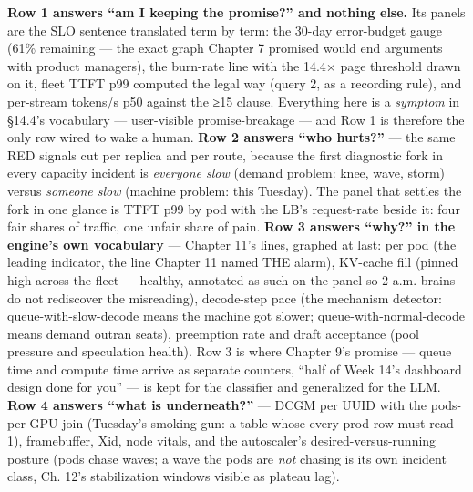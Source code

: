 \textbf{Row 1 answers “am I keeping the promise?” and nothing else.} Its panels are the SLO sentence translated term by term: the 30-day error-budget gauge (61\% remaining — the exact graph Chapter 7 promised would end arguments with product managers), the burn-rate line with the 14.4× page threshold drawn on it, fleet TTFT p99 computed the legal way (query 2, as a recording rule), and per-stream tokens/s p50 against the ≥15 clause. Everything here is a \textit{symptom} in §14.4’s vocabulary — user-visible promise-breakage — and Row 1 is therefore the only row wired to wake a human. \textbf{Row 2 answers “who hurts?”} — the same RED signals cut per replica and per route, because the first diagnostic fork in every capacity incident is \textit{everyone slow} (demand problem: knee, wave, storm) versus \textit{someone slow} (machine problem: this Tuesday). The panel that settles the fork in one glance is TTFT p99 by pod with the LB’s request-rate beside it: four fair shares of traffic, one unfair share of pain. \textbf{Row 3 answers “why?” in the engine’s own vocabulary} — Chapter 11’s lines, graphed at last:  per pod (the leading indicator, the line Chapter 11 named THE alarm), KV-cache fill (pinned high across the fleet — healthy, annotated as such on the panel so 2 a.m. brains do not rediscover the misreading), decode-step pace (the mechanism detector: queue-with-slow-decode means the machine got slower; queue-with-normal-decode means demand outran seats), preemption rate and draft acceptance (pool pressure and speculation health). Row 3 is where Chapter 9’s promise — queue time and compute time arrive as separate counters, “half of Week 14’s dashboard design done for you” — is kept for the classifier and generalized for the LLM. \textbf{Row 4 answers “what is underneath?”} — DCGM per UUID with the pods-per-GPU join (Tuesday’s smoking gun: a table whose every prod row must read 1), framebuffer, Xid, node vitals, and the autoscaler’s desired-versus-running posture (pods chase waves; a wave the pods are \textit{not} chasing is its own incident class, Ch. 12’s stabilization windows visible as plateau lag).

